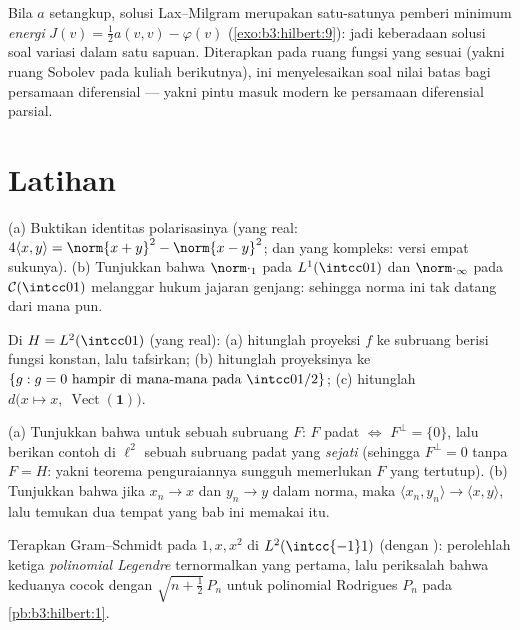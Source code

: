 \begin{remark}\label{rem:b3:hilbert:variational}
Bila $a$ setangkup, solusi Lax--Milgram merupakan satu-satunya
pemberi minimum \emph{energi} $J(v) = \frac12a(v,v) -
\varphi(v)$ (\cref{exo:b3:hilbert:9}): jadi keberadaan solusi
soal variasi dalam satu sapuan. Diterapkan pada ruang fungsi
yang sesuai (yakni ruang Sobolev pada kuliah berikutnya), ini
menyelesaikan soal nilai batas bagi persamaan diferensial ---
yakni pintu masuk modern ke persamaan diferensial parsial.
\end{remark}

\section{Latihan}

\begin{exercise}[$\star$]\label{exo:b3:hilbert:1}
(a) Buktikan identitas polarisasinya (yang real: $4\langle x,
y\rangle = \norm{x+y}^2 - \norm{x-y}^2$; dan yang kompleks: versi
empat sukunya).
(b) Tunjukkan bahwa $\norm\cdot_1$ pada $L^1(\intcc01)$ dan
$\norm\cdot_\infty$ pada $\mathcal C(\intcc01)$ melanggar
hukum jajaran genjang: sehingga norma ini tak datang dari  mana pun.
\end{exercise}

\begin{exercise}[$\star$]\label{exo:b3:hilbert:2}
Di $H = L^2(\intcc01)$ (yang real):
(a) hitunglah proyeksi $f$ ke subruang berisi
fungsi konstan, lalu tafsirkan;
(b) hitunglah proyeksinya ke $\{g : g = 0 \text{ hampir di mana-mana pada }
\intcc0{1/2}\}$;
(c) hitunglah $d\bigl(x \mapsto x,\ \operatorname{Vect}(\mathbf
1)\bigr)$.
\end{exercise}

\begin{exercise}[$\star\star$]\label{exo:b3:hilbert:3}
(a) Tunjukkan bahwa untuk sebuah subruang $F$: $F$ padat $\iff$ $F^\perp =
\{0\}$, lalu berikan contoh di $\ell^2$ sebuah subruang padat
yang \emph{sejati} (sehingga $F^\perp = 0$ tanpa $F = H$: yakni
teorema penguraiannya sungguh memerlukan $F$ yang tertutup).
(b) Tunjukkan bahwa jika $x_n \to x$ dan $y_n \to y$ dalam norma, maka
$\langle x_n, y_n\rangle \to \langle x, y\rangle$, lalu temukan
dua tempat yang bab ini memakai  itu.
\end{exercise}

\begin{exercise}[$\star\star$]\label{exo:b3:hilbert:4}
Terapkan Gram--Schmidt pada $1, x, x^2$ di $L^2(\intcc{-1}1)$
(dengan ): perolehlah ketiga
\emph{polinomial Legendre} ternormalkan yang pertama, lalu periksalah bahwa keduanya cocok dengan
$\sqrt{n + \frac12}\,P_n$ untuk polinomial Rodrigues $P_n$
pada \cref{pb:b3:hilbert:1}.
\end{exercise}

